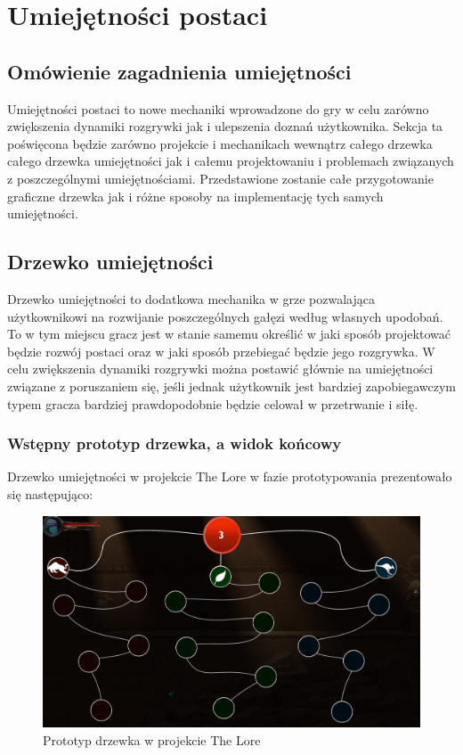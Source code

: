 \documentclass[oneside,polski,logo]{amuthesis}
\begin{document}
\section{Umiejętności postaci}
\subsection{Omówienie zagadnienia umiejętności}
Umiejętności postaci to nowe mechaniki wprowadzone do gry w celu zarówno zwiększenia dynamiki rozgrywki jak i ulepszenia doznań użytkownika. Sekcja ta poświęcona będzie zarówno projekcie i mechanikach wewnątrz całego drzewka całego drzewka umiejętności jak i całemu projektowaniu i problemach związanych z poszczególnymi umiejętnościami. Przedstawione zostanie całe przygotowanie graficzne drzewka jak i różne sposoby na implementację tych samych umiejętności.
\subsection{Drzewko umiejętności}
Drzewko umiejętności to dodatkowa mechanika w grze pozwalająca użytkownikowi na rozwijanie poszczególnych gałęzi według własnych upodobań. To w tym miejscu gracz jest w stanie samemu określić w jaki sposób projektować będzie rozwój postaci oraz w jaki sposób przebiegać będzie jego rozgrywka. W celu zwiększenia dynamiki rozgrywki można postawić głównie na umiejętności związane z poruszaniem się, jeśli jednak użytkownik jest bardziej zapobiegawczym typem gracza bardziej prawdopodobnie będzie celował w przetrwanie i siłę. 
\subsubsection{Wstępny prototyp drzewka, a widok końcowy}
Drzewko umiejętności w projekcie The Lore w fazie prototypowania prezentowało się następująco:

\begin{figure}[h]
	\centering
	\includegraphics[width=13cm]{images/kozubal/drzewkoPrototyp.jpg}
	\caption{Prototyp drzewka w projekcie The Lore}
\end{figure}
\end{document}
